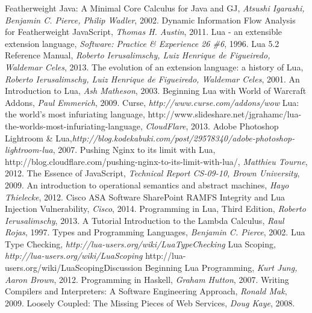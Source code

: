 \begin{thebibliography}{10}

 Featherweight Java: A Minimal Core Calculus for Java and GJ, {\it Atsushi Igarashi, Benjamin C. Pierce, Philip Wadler}, 2002.
 Dynamic Information Flow Analysis for Featherweight JavaScript, {\it Thomas H. Austin}, 2011.
 Lua - an extensible extension language, {\it  Software: Practice \& Experience 26 \#6}, 1996.
 Lua 5.2 Reference Manual, {\it Roberto Ierusalimschy, Luiz Henrique de Figueiredo, Waldemar Celes}, 2013.
 The evolution of an extension language: a history of Lua, {\it  Roberto Ierusalimschy, Luiz Henrique de Figueiredo, Waldemar Celes}, 2001.
 An Introduction to Lua, {\it  Ash Matheson}, 2003.
 Beginning Lua with World of Warcraft Addons, {\it Paul Emmerich}, 2009.
 Curse, {\it http://www.curse.com/addons/wow}
 Lua: the world's most infuriating language, http://www.slideshare.net/jgrahamc/lua-the-worlds-most-infuriating-language, {\it CloudFlare}, 2013.
 Adobe Photoshop Lightroom \& Lua,{\it http://blog.kodekabuki.com/post/29578340/adobe-photoshop-lightroom-lua}, 2007.
 Pushing Nginx to its limit with Lua, http://blog.cloudflare.com/pushing-nginx-to-its-limit-with-lua/, {\it  Matthieu Tourne}, 2012.
 The Essence of JavaScript, {\it Technical Report CS-09-10, Brown University}, 2009.
 An introduction to operational semantics and abstract machines, {\it Hayo Thielecke}, 2012.
 Cisco ASA Software SharePoint RAMFS Integrity and Lua Injection Vulnerability, {\it Cisco}, 2014.
 Programming in Lua, Third Edition, {\it  Roberto Ierusalimschy}, 2013.
 A Tutorial Introduction to the Lambda Calculus, {\it Raul Rojas}, 1997.
 Types and Programming Languages, {\it Benjamin C. Pierce}, 2002.
 Lua Type Checking, {\it http://lua-users.org/wiki/LuaTypeChecking}
 Lua Scoping, {\it http://lua-users.org/wiki/LuaScoping}
 http://lua-users.org/wiki/LuaScopingDiscussion
 Beginning Lua Programming, {\it Kurt Jung, Aaron Brown}, 2012.
 Programming in Haskell, {\it Graham Hutton}, 2007.
 Writing Compilers and Interpreters: A Software Engineering Approach, {\it Ronald Mak}, 2009.
 Loosely Coupled: The Missing Pieces of Web Services, {\it Doug Kaye}, 2008.
\\

\end{thebibliography}
